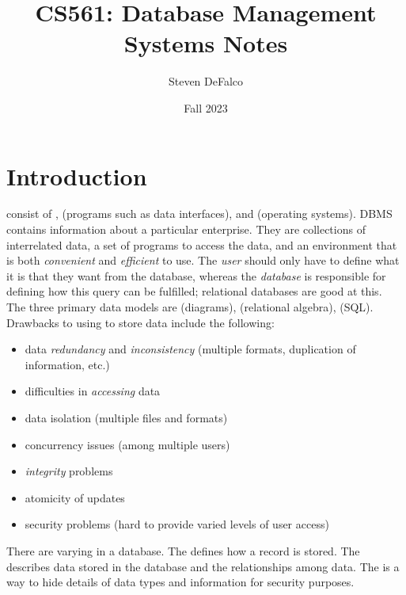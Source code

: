 \documentclass{article}
\title{CS561: Database Management Systems Notes}
\author{Steven DeFalco}
\date{Fall 2023}
\begin{document}
\maketitle
\tableofcontents
\newpage



\section{Introduction}

 consist of ,  (programs such as data interfaces), and  (operating systems). DBMS contains information about a particular enterprise. They are collections of interrelated data, a set of programs to access the data, and an environment that is both \emph{convenient} and \emph{efficient} to use. The \emph{user} should only have to define what it is that they want from the database, whereas the \emph{database} is responsible for defining how this query can be fulfilled; relational databases are good at this. \\

The three primary data models are  (diagrams),  (relational algebra),  (SQL). \\

Drawbacks to using  to store data include the following: 

\begin{itemize}
  \item data \emph{redundancy} and \emph{inconsistency} (multiple formats, duplication of information, etc.)
  \item difficulties in \emph{accessing} data 
  \item data isolation (multiple files and formats) 
  \item concurrency issues (among multiple users)
  \item \emph{integrity} problems 
  \item atomicity of updates
  \item security problems (hard to provide varied levels of user access)
\end{itemize}

There are varying  in a database. The  defines how a record is stored. The  describes data stored in the database and the relationships among data. The  is a way to hide details of data types and information for security purposes. \\ 
\end{document}
